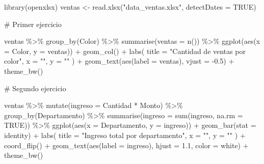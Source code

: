 \documentclass[
  letterpaper,
  DIV=11,
  numbers=noendperiod]{scrreprt}
\newenvironment{Shaded}{\begin{snugshade}}{\end{snugshade}}
\newcommand{\AttributeTok}[1]{\textcolor[rgb]{0.40,0.45,0.13}{#1}}
\newcommand{\CommentTok}[1]{\textcolor[rgb]{0.37,0.37,0.37}{#1}}
\newcommand{\ConstantTok}[1]{\textcolor[rgb]{0.56,0.35,0.01}{#1}}
\newcommand{\FloatTok}[1]{\textcolor[rgb]{0.68,0.00,0.00}{#1}}
\newcommand{\FunctionTok}[1]{\textcolor[rgb]{0.28,0.35,0.67}{#1}}
\newcommand{\NormalTok}[1]{\textcolor[rgb]{0.00,0.23,0.31}{#1}}
\newcommand{\OtherTok}[1]{\textcolor[rgb]{0.00,0.23,0.31}{#1}}
\newcommand{\SpecialCharTok}[1]{\textcolor[rgb]{0.37,0.37,0.37}{#1}}
\newcommand{\StringTok}[1]{\textcolor[rgb]{0.13,0.47,0.30}{#1}}
\begin{document}
\begin{Shaded}
\begin{Highlighting}[]
\FunctionTok{library}\NormalTok{(openxlsx)}
\NormalTok{ventas }\OtherTok{\textless{}{-}} \FunctionTok{read.xlsx}\NormalTok{(}\StringTok{"data\_ventas.xlsx"}\NormalTok{, }\AttributeTok{detectDates =} \ConstantTok{TRUE}\NormalTok{)}

\CommentTok{\# Primer ejercicio}

\NormalTok{ventas }\SpecialCharTok{\%\textgreater{}\%} 
  \FunctionTok{group\_by}\NormalTok{(Color) }\SpecialCharTok{\%\textgreater{}\%} 
  \FunctionTok{summarise}\NormalTok{(}\AttributeTok{ventas =} \FunctionTok{n}\NormalTok{()) }\SpecialCharTok{\%\textgreater{}\%} 
  \FunctionTok{ggplot}\NormalTok{(}\FunctionTok{aes}\NormalTok{(}\AttributeTok{x =}\NormalTok{ Color, }\AttributeTok{y =}\NormalTok{ ventas)) }\SpecialCharTok{+}
  \FunctionTok{geom\_col}\NormalTok{() }\SpecialCharTok{+}
  \FunctionTok{labs}\NormalTok{(}
    \AttributeTok{title =} \StringTok{"Cantidad de ventas por color"}\NormalTok{,}
    \AttributeTok{x =} \StringTok{""}\NormalTok{,}
    \AttributeTok{y =} \StringTok{""}
\NormalTok{  ) }\SpecialCharTok{+}
  \FunctionTok{geom\_text}\NormalTok{(}\FunctionTok{aes}\NormalTok{(}\AttributeTok{label =}\NormalTok{ ventas), }\AttributeTok{vjust =} \SpecialCharTok{{-}}\FloatTok{0.5}\NormalTok{) }\SpecialCharTok{+}
  \FunctionTok{theme\_bw}\NormalTok{()}

\CommentTok{\# Segundo ejercicio}

\NormalTok{ventas }\SpecialCharTok{\%\textgreater{}\%} 
  \FunctionTok{mutate}\NormalTok{(}\AttributeTok{ingreso =}\NormalTok{ Cantidad }\SpecialCharTok{*}\NormalTok{ Monto) }\SpecialCharTok{\%\textgreater{}\%} 
  \FunctionTok{group\_by}\NormalTok{(Departamento) }\SpecialCharTok{\%\textgreater{}\%} 
  \FunctionTok{summarise}\NormalTok{(}\AttributeTok{ingreso =} \FunctionTok{sum}\NormalTok{(ingreso, }\AttributeTok{na.rm =} \ConstantTok{TRUE}\NormalTok{)) }\SpecialCharTok{\%\textgreater{}\%} 
  \FunctionTok{ggplot}\NormalTok{(}\FunctionTok{aes}\NormalTok{(}\AttributeTok{x =}\NormalTok{ Departamento, }\AttributeTok{y =}\NormalTok{ ingreso)) }\SpecialCharTok{+}
  \FunctionTok{geom\_bar}\NormalTok{(}\AttributeTok{stat =} \StringTok{\textquotesingle{}identity\textquotesingle{}}\NormalTok{) }\SpecialCharTok{+}
  \FunctionTok{labs}\NormalTok{(}
    \AttributeTok{title =} \StringTok{"Ingreso total por departamento"}\NormalTok{,}
    \AttributeTok{x =} \StringTok{""}\NormalTok{, }
    \AttributeTok{y =} \StringTok{""}
\NormalTok{  ) }\SpecialCharTok{+}
  \FunctionTok{coord\_flip}\NormalTok{() }\SpecialCharTok{+}
  \FunctionTok{geom\_text}\NormalTok{(}\FunctionTok{aes}\NormalTok{(}\AttributeTok{label =}\NormalTok{ ingreso), }\AttributeTok{hjust =} \FloatTok{1.1}\NormalTok{, }\AttributeTok{color =} \StringTok{\textquotesingle{}white\textquotesingle{}}\NormalTok{) }\SpecialCharTok{+}
  \FunctionTok{theme\_bw}\NormalTok{()}


\end{Highlighting}
\end{Shaded}
\end{document}
